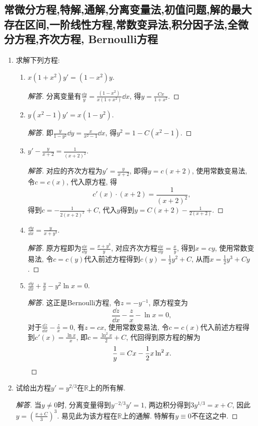 \subsection{常微分方程,特解,通解,分离变量法,初值问题,解的最大存在区间,一阶线性方程,常数变异法,积分因子法,全微分方程,齐次方程, Bernoulli方程}
\begin{5a}
\begin{enumerate}
\item 求解下列方程:
\begin{enumerate}[label=(\arabic*)]
\item \(x(1+x^2)y'=(1-x^2)y.\)
\begin{proof}[解答]
分离变量有\(\frac{\dd y}{y}=\frac{(1-x^2)}{x(1+x^2)}\dd x\), 
得\(y=\frac{Cx}{1+x^2}.\)
\end{proof}
\item \(y(x^2-1)y'=x(1-y^2).\)
\begin{proof}[解答]
即\(\frac{y}{1-y^2}\dd y=\frac{x}{x^2-1}\dd x\), 得\(y^2=1-C(x^2-1).\)
\end{proof}
\item \(y'-\frac{y}{x+2}=\frac{1}{(x+2)^2}.\)
\begin{proof}[解答]
对应的齐次方程为\(y'=\frac{y}{x+2}\), 即得\(y=c(x+2)\), 
使用常数变易法, 令\(c=c(x)\), 代入原方程, 得\[c'(x)\cdot(x+2)=\frac{1}{(x+2)^2},\]
得到\(c=-\frac{1}{2(x+2)^2}+C\), 代入\(y\)得到\(y=C(x+2)-\frac{1}{2(x+2)}.\)
\end{proof}
\item \(\frac{\dd y}{\dd x}=\frac{y}{x+y^3}\).
\begin{proof}[解答]
原方程即为\(\frac{\dd x}{\dd y}=\frac{x+y^3}{y}\), 
对应齐次方程\(\frac{\dd x}{\dd y}=\frac{x}{y}\), 得到\(x=cy\), 
使用常数变易法, 令\(c=c(y)\)代入前述方程得到\(c(y)=\frac{1}{2}y^2+C\), 
从而\(x=\frac{1}{2}y^3+Cy\).
\end{proof}
\item \(\frac{\dd y}{\dd x}+\frac{y}{x}-y^2\ln x=0.\)
\begin{proof}[解答]
这正是Bernoulli方程, 令\(z=-y^{-1}\), 原方程变为
\[\frac{\dd z}{\dd x}-\frac{z}{x}-\ln x=0,\]
对于\(\frac{\dd z}{\dd x}-\frac{z}{x}=0\), 有\(z=cx\), 
使用常数变易法, 令\(c=c(x)\)代入前述方程得到\(c'(x)=\frac{\ln x}{x}\), 
即\(c=\frac{\ln^2x}{2}+C\), 代回得到原方程的解为
\[\frac{1}{y}=Cx-\frac{1}{2}x\ln^2x.\qedhere\]
\end{proof}
\end{enumerate}
\item 试给出方程\(y'=y^{2/3}\)在\(\mathbb{R}\)上的所有解.
\begin{proof}[解答]
当\(y\ne 0\)时, 分离变量得到\(y^{-2/3}y'=1\), 
两边积分得到\(3y^{1/3}=x+C\), 因此\(y=\left(\frac{x+C}{3}\right)^3\). 
易见此为该方程在\(\mathbb{R}\)上的通解. 特解有\(y \equiv 0\)不在这之中.
\end{proof}
\end{enumerate}
\end{5a}

